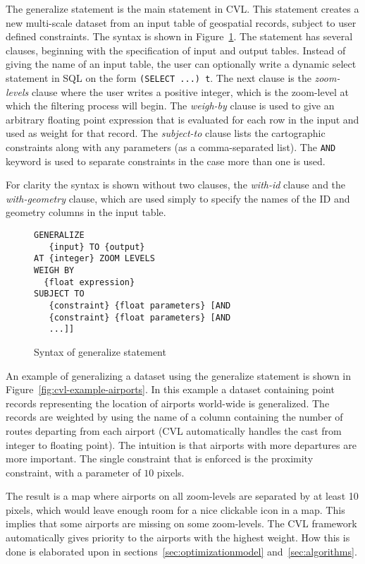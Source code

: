 The generalize statement is the main statement in CVL. This statement creates a new multi-scale dataset from an input table of geospatial records, subject to user defined constraints. The syntax is shown in Figure~\ref{fig:generalize-syntax}. The statement has several clauses, beginning with the specification of input and output tables. Instead of giving the name of an input table, the user can optionally write a dynamic select statement in SQL on the form \texttt{(SELECT ...) t}. The next clause is the \emph{zoom-levels} clause where the user writes a positive integer, which is the zoom-level  at which the filtering process will begin. The \emph{weigh-by} clause is used to give an arbitrary floating point expression that is evaluated for each row in the input and used as weight for that record. The \emph{subject-to} clause lists the cartographic constraints along with any parameters (as a comma-separated list). The \texttt{AND} keyword is used to separate constraints in the case more than one is used.

For clarity the syntax is shown without two clauses, the \emph{with-id} clause and the \emph{with-geometry} clause, which are used simply to specify the names of the ID and geometry columns in the input table.

\begin{figure}[htbp]
\begin{center}
\begin{lstlisting}
GENERALIZE 
   {input} TO {output}
AT {integer} ZOOM LEVELS
WEIGH BY
  {float expression}
SUBJECT TO 
   {constraint} {float parameters} [AND
   {constraint} {float parameters} [AND
   ...]]
\end{lstlisting}
\caption{Syntax of generalize statement}
\label{fig:generalize-syntax}
\end{center}
\end{figure}

An example of generalizing a dataset using the generalize statement is shown in Figure~\ref{fig:cvl-example-airports}. In this example a dataset containing point records representing the location of airports world-wide is generalized. The records are weighted by using the name of a column containing the number of routes departing from each airport (CVL automatically handles the cast from integer to floating point). The intuition is that airports with more departures are more important. The single constraint that is enforced is the proximity constraint, with a parameter of $10$ pixels.

The result is a map where airports on all zoom-levels are separated by at least 10 pixels, which would leave enough room for a nice clickable icon in a map. This implies that some airports are missing on some zoom-levels. The CVL framework automatically gives priority to the airports with the highest weight. How this is done is elaborated upon in sections~\ref{sec:optimizationmodel} and~\ref{sec:algorithms}.

